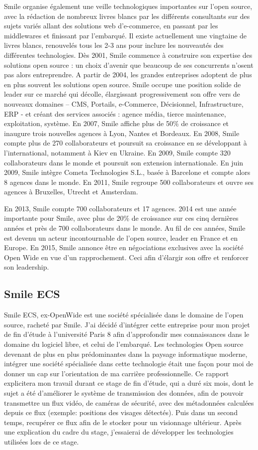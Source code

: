 Smile organise également une veille technologiques importantes sur l’open source, avec la
rédaction de nombreux livres blancs par les différents consultants sur des sujets variés allant
des solutions web d’e-commerce, en passant par les middlewares et finissant par
l’embarqué. Il existe actuellement une vingtaine de livres blancs, renouvelés tous les 2-3 ans
pour inclure les nouveautés des différentes technologies.
Dès 2001, Smile commence à construire son expertise des solutions open source : un choix
d’avenir que beaucoup de ses concurrents n’osent pas alors entreprendre.
A partir de 2004, les grandes entreprises adoptent de plus en plus souvent les solutions open
source. Smile occupe une position solide de leader sur ce marché qui décolle, élargissant
progressivement son offre vers de nouveaux domaines – CMS, Portails, e-Commerce,
Décisionnel, Infrastructure, ERP - et créant des services associés : agence média, tierce
maintenance, exploitation, système. En 2007, Smile affiche plus de 50\% de croissance et
inaugure trois nouvelles agences à Lyon, Nantes et Bordeaux.
En 2008, Smile compte plus de 270 collaborateurs et poursuit sa croissance en se
développant à l'international, notamment à Kiev en Ukraine.
En 2009, Smile compte 320 collaborateurs dans le monde et poursuit son extension
internationale. En juin 2009, Smile intègre Cometa Technologies S.L., basée à Barcelone et
compte alors 8 agences dans le monde.
En 2011, Smile regroupe 500 collaborateurs et ouvre ses agences à Bruxelles, Utrecht et
Amsterdam.

En 2013, Smile compte 700 collaborateurs et 17 agences.
2014 est une année importante pour Smile, avec plus de 20\% de croissance sur ces cinq
dernières années et près de 700 collaborateurs dans le monde. Au fil de ces années, Smile est
devenu un acteur incontournable de l’open source, leader en France et en Europe.
En 2015, Smile annonce être en négociations exclusives avec la société Open Wide en vue
d’un rapprochement. Ceci afin d'élargir son offre et renforcer son leadership.


\subsection{Smile ECS}
Smile ECS, ex-OpenWide est une société spécialisée dans le domaine de l'open source, racheté par Smile. J'ai décidé d'intégrer cette entreprise pour mon projet de fin d'étude à l'université Paris 8 afin
d'approfondir mes connaissances dans le domaine du logiciel libre, et celui de l'embarqué.
 Les technologies Open source devenant de plus en plus prédominantes dans la paysage informatique
moderne, intégrer une société spécialisée dans cette technologie était une façon pour
moi de donner un cap sur l'orientation de ma carrière professionnelle.
Ce rapport explicitera mon travail durant ce stage de fin d'étude, qui a duré
six mois, dont le sujet a été d'améliorer le système de transmission des données,
afin de pouvoir transmettre un flux vidéo, de caméras de sécurité, avec des métadonnées
calculées depuis ce flux (exemple: positions des visages détectés). Puis dans un second temps,
recupérer ce flux afin de le stocker pour un visionnage ultérieur.
Après une explication du cadre du stage, j'essaierai de développer les technologies
utilisées lors de ce stage.
